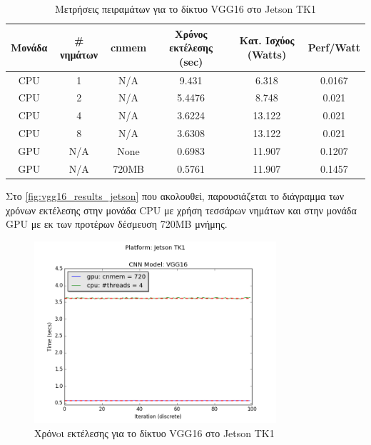 \begin{table}[H]
  \begin{center}
    \caption{Μετρήσεις πειραμάτων για το δίκτυο VGG16 στο Jetson TK1}
    \label{tab:vgg16_jetson}
    \small
    \begin{tabular}[center]{ | c | c | c | c | c | c | }
      \hline
      \rowcolor{Gray}
      Μονάδα & \# νημάτων & cnmem & Χρόνος εκτέλεσης (sec) & Κατ. Ισχύος (Watts) & Perf/Watt \\
      \hline
      CPU & 1 & N/A & 9.431 & 6.318 & 0.0167\\
      CPU & 2 & N/A & 5.4476 &  8.748 & 0.021\\
      CPU & 4 & N/A & 3.6224 & 13.122 & 0.021\\
      CPU & 8 & N/A & 3.6308 & 13.122 & 0.021\\
      GPU & N/A & None & 0.6983 & 11.907 & 0.1207\\
      GPU & N/A & 720MB & 0.5761 & 11.907 & 0.1457\\
      \hline
    \end{tabular}
  \end{center}
\end{table}

Στο \autoref{fig:vgg16_results_jetson} που ακολουθεί, παρουσιάζεται το διάγραμμα
των χρόνων εκτέλεσης στην μονάδα CPU με χρήση τεσσάρων νημάτων και στην μονάδα
GPU με εκ των προτέρων δέσμευση 720MB μνήμης.

\begin{figure}[H]
  \centering
  \includegraphics[width=0.8\textwidth]{./images/chapter6/benchmark_vgg16_jetson.png}
  \caption[Χρόνoι εκτέλεσης για το δίκτυο VGG16 στο Jetson TK1]{Χρόνoι εκτέλεσης για το δίκτυο VGG16 στο Jetson TK1}
  \label{fig:vgg16_results_jetson}
\end{figure}

